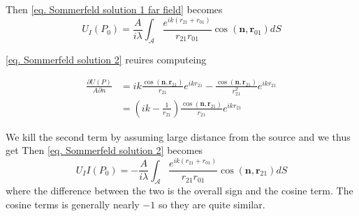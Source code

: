 \documentclass[../../main.tex]{subfiles}
\begin{document}
Then \cref{eq. Sommerfeld solution 1 far field} becomes
\begin{equation}\label{eq. Sommerfeld solution 1 far field spherical wave}
    U_I(P_0)=\frac{A}{i\lambda}\int_{\mathcal{A}}\frac{e^{ik(r_{21}+r_{01})}}{r_{21}r_{01}}\cos{(\mathbf{n},\mathbf{r}_{01})}dS
\end{equation}

\cref{eq. Sommerfeld solution 2} reuires computeing 

\begin{equation}
\begin{aligned}
\frac{\partial U(P)}{A\partial n}&=ik\frac{\cos{(\mathbf{n},\mathbf{r}_{21})}}{r_{21}}e^{ikr_{21}}-\frac{\cos{(\mathbf{n},\mathbf{r}_{21})}}{r_{21}^2}e^{ikr_{21}}\\
&=(ik-\frac{1}{r_{21}})\frac{\cos{(\mathbf{n},\mathbf{r}_{21})}}{r_{21}}e^{ikr_{21}}
\end{aligned}
\end{equation}

We kill the second term by assuming large distance from the source and  we thus get
Then \cref{eq. Sommerfeld solution 2} becomes
\begin{equation}\label{eq. Sommerfeld solution 2 far field spherical wave}
    U_II(P_0)=-\frac{A}{i\lambda}\int_{\mathcal{A}}\frac{e^{ik(r_{21}+r_01)}}{r_{21} r_01}\cos(\mathbf{n},\mathbf{r}_{21})dS
\end{equation}
 where the difference between the two is the overall sign and the cosine term. The cosine terms is generally nearly $-1$ so they are quite similar.
 
 
\end{document}
